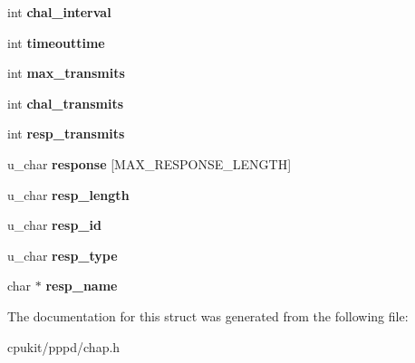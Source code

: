 \begin{DoxyCompactItemize}
int {\bfseries chal\+\_\+interval}
\item 
\mbox{\label{structchap__state_a90a2c2bd3076b1db20eca1ac2601d280}} 
int {\bfseries timeouttime}
\item 
\mbox{\label{structchap__state_a5a5696ce7040ab9769f64bab0ffbe825}} 
int {\bfseries max\+\_\+transmits}
\item 
\mbox{\label{structchap__state_a4d8ae182fc466771022b35d9c5c41f2f}} 
int {\bfseries chal\+\_\+transmits}
\item 
\mbox{\label{structchap__state_a8b6e7c318e18b67c7d39ee0dca3d230e}} 
int {\bfseries resp\+\_\+transmits}
\item 
\mbox{\label{structchap__state_a0e63b4e0621598097d068de419401e44}} 
u\+\_\+char {\bfseries response} \mbox{[}M\+A\+X\+\_\+\+R\+E\+S\+P\+O\+N\+S\+E\+\_\+\+L\+E\+N\+G\+TH\mbox{]}
\item 
\mbox{\label{structchap__state_af84fa994067a3b46c7529ad4c7ed63e8}} 
u\+\_\+char {\bfseries resp\+\_\+length}
\item 
\mbox{\label{structchap__state_abfcf32921adb80b75936de6721c9230d}} 
u\+\_\+char {\bfseries resp\+\_\+id}
\item 
\mbox{\label{structchap__state_a0eb4b9f34d8b1dbd413dd437dd58ec50}} 
u\+\_\+char {\bfseries resp\+\_\+type}
\item 
\mbox{\label{structchap__state_ac72dd89bc14075810af9756b6bae93a6}} 
char $\ast$ {\bfseries resp\+\_\+name}
\end{DoxyCompactItemize}


The documentation for this struct was generated from the following file\+:\begin{DoxyCompactItemize}
\item 
cpukit/pppd/chap.\+h\end{DoxyCompactItemize}
